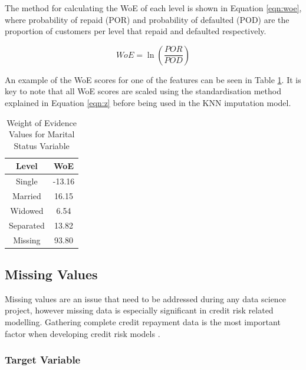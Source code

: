 The method for calculating the WoE of each level is shown in Equation \ref{eqn:woe}, where probability of repaid (POR) and probability of defaulted (POD) are the proportion of customers per level that repaid and defaulted respectively. 

\vspace{10pt}

\begin{equation}\label{eqn:woe}
    WoE = \ln{\left(\dfrac{POR}{POD}\right)}
\end{equation}

\vspace{10pt}

An example of the WoE scores for one of the features can be seen in Table \ref{table:woe}. It is key to note that all WoE scores are scaled using the standardisation method explained in Equation \ref{eqn:z} before being used in the KNN imputation model.  

\vspace{10pt}

\begin{table}[H]
\begin{center}
\begin{tabular}{|c|c|} 
\hline
\multicolumn{1}{|c}{Level} &\multicolumn{1}{|c|}{WoE}\\
\hline
Single & -13.16  \\
\hline
Married & 16.15  \\
\hline
Widowed & 6.54  \\
\hline
Separated & 13.82\\
\hline
Missing & 93.80\\
\hline
\end{tabular}
\end{center}
\caption{Weight of Evidence Values for Marital Status Variable}
\label{table:woe}
\end{table}

\subsection{Missing Values}

Missing values are an issue that need to be addressed during any data science project, however missing data is especially significant in credit risk related modelling. Gathering complete credit repayment data is the most important factor when developing credit risk models \parencite{MissingValuesBos}.

\subsubsection{Target Variable}


